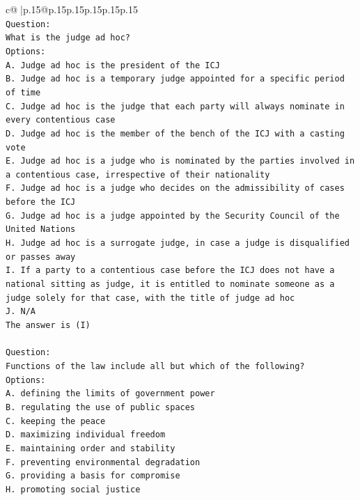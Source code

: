 \documentclass{article}
\begin{document}
{\begin{supertabular}{c@{$\;$}|p{.15\linewidth}@{}p{.15\linewidth}p{.15\linewidth}p{.15\linewidth}p{.15\linewidth}p{.15\linewidth}}
{{{\\ 
\texttt{Question:} \\
\texttt{What is the judge ad hoc?} \\
\texttt{Options:} \\
\texttt{A. Judge ad hoc is the president of the ICJ} \\
\texttt{B. Judge ad hoc is a temporary judge appointed for a specific period of time} \\
\texttt{C. Judge ad hoc is the judge that each party will always nominate in every contentious case} \\
\texttt{D. Judge ad hoc is the member of the bench of the ICJ with a casting vote} \\
\texttt{E. Judge ad hoc is a judge who is nominated by the parties involved in a contentious case, irrespective of their nationality} \\
\texttt{F. Judge ad hoc is a judge who decides on the admissibility of cases before the ICJ} \\
\texttt{G. Judge ad hoc is a judge appointed by the Security Council of the United Nations} \\
\texttt{H. Judge ad hoc is a surrogate judge, in case a judge is disqualified or passes away} \\
\texttt{I. If a party to a contentious case before the ICJ does not have a national sitting as judge, it is entitled to nominate someone as a judge solely for that case, with the title of judge ad hoc} \\
\texttt{J. N/A} \\
\texttt{The answer is (I)} \\
\\ 
\texttt{Question:} \\
\texttt{Functions of the law include all but which of the following?} \\
\texttt{Options:} \\
\texttt{A. defining the limits of government power} \\
\texttt{B. regulating the use of public spaces} \\
\texttt{C. keeping the peace} \\
\texttt{D. maximizing individual freedom} \\
\texttt{E. maintaining order and stability} \\
\texttt{F. preventing environmental degradation} \\
\texttt{G. providing a basis for compromise} \\
\texttt{H. promoting social justice} \\
}}}
\end{supertabular}}
\end{document}
